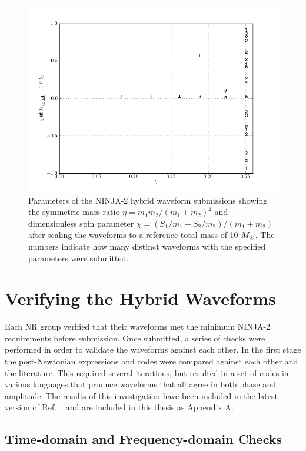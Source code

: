 \begin{figure}
  \includegraphics[width=\linewidth]{figures/ninja2/ninja2_cat.png}
  \caption[Parameters of the NINJA-2 submissions]{
  \label{f:ninja2_param_map}
Parameters of the NINJA-2 hybrid waveform submissions showing the
symmetric mass ratio $\eta=m_1 m_2 /(m_1+m_2)^2$ and dimensionless
spin parameter $\chi=(S_1/m_1 + S_2/m_2)/(m_1+m_2)$ after scaling the
waveforms to a reference total mass of 10 $M_\odot$.  The numbers indicate 
how many distinct waveforms with the specified parameters were submitted.}
\end{figure}%

\section{Verifying the Hybrid Waveforms}

Each NR group verified that their waveforms met the minimum NINJA-2
requirements before submission.  Once submitted, a series of checks
were performed in order to validate the waveforms against each other.
In the first stage the post-Newtonian expressions and codes were
compared against each other and the literature.  This required several
iterations, but resulted in a set of codes in various languages that
produce waveforms that all agree in both phase and amplitude.   The
results of this investigation have been included in the latest version
of Ref.~\cite{Brown:2007jx}, and are included in this thesis as
Appendix A.


\subsection{Time-domain and Frequency-domain Checks}

